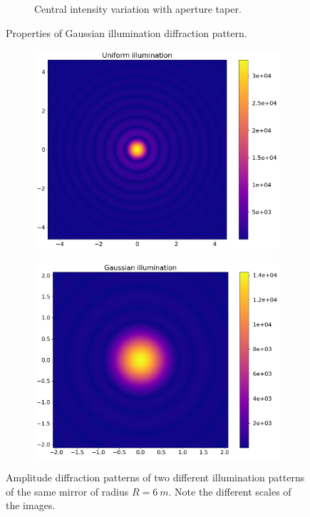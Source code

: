 \documentclass{article}
\begin{document}
\begin{figure}
\begin{subfigure}{0.49\textwidth}
        \caption{Central intensity variation with aperture taper.}\label{fig:gauss:int}
    \end{subfigure}
    \caption{Properties of Gaussian illumination diffraction pattern.}\label{fig:gauss}
\end{figure}

\begin{figure}
    \centering
    \begin{subfigure}{0.5\textwidth}
        \centering
        \includegraphics[width=\textwidth]{pictures/gauss/uniform.png}
        \caption{}\label{fig:gpic:uniform}
    \end{subfigure}%
    \begin{subfigure}{0.5\textwidth}
        \centering
        \includegraphics[width=\textwidth]{pictures/gauss/gaussian.png}
        \caption{}\label{fig:gpic:gauss}
    \end{subfigure}
    \caption{Amplitude diffraction patterns of two different illumination patterns of the same mirror of radius $R=\SI{6}{m}$. Note the different scales of the images.}\label{fig:gpic}
\end{figure}
\end{document}
